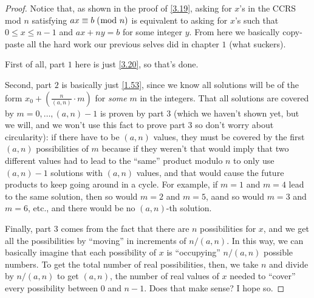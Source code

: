 \documentclass[../main.tex]{subfiles}
\begin{document}
\begin{proof}
  Notice that, as shown in the proof of \ref{3.19}, asking for $x$'s in the CCRS mod $n$ satisfying $ax \equiv b \; (\bmod \; n)$ is equivalent to asking for $x$'s such that $0 \leq x \leq n-1$ and $ax + ny = b$ for some integer $y$. From here we basically copy-paste all the hard work our previous selves did in chapter $1$ (what suckers).

  First of all, part $1$ here is just \ref{3.20}, so that's done.

  Second, part $2$ is basically just \ref{1.53}, since we know all solutions will be of the form $x_0 + \left( \frac{n}{(a,n)} \cdot m \right)$ for \emph{some} $m$ in the integers. That all solutions are covered by $m = 0, \ldots, (a,n) - 1$ is proven by part $3$ (which we haven't shown yet, but we will, and we won't use this fact to prove part $3$ so don't worry about circularity): if there have to be $(a,n)$ values, they must be covered by the first $(a,n)$ possibilities of $m$ because if they weren't that would imply that two different values had to lead to the ``same'' product modulo $n$ to only use $(a,n) - 1$ solutions with $(a, n)$ values, and that would cause the future products to keep going around in a cycle.
  For example, if $m = 1$ and $m = 4$ lead to the same solution, then so would $m = 2$ and $m = 5$, aand so would $m = 3$ and $m = 6$, etc., and there would be no $(a, n)$-th solution.

  Finally, part $3$ comes from the fact that there are $n$ possibilities for $x$, and we get all the possibilities by ``moving'' in increments of $n / (a,n)$. In this way, we can basically imagine that each possibility of $x$ is ``occupying'' $n / (a,n)$ possible numbers. To get the total number of real possibilities, then, we take $n$ and divide by $n / (a, n)$ to get $(a, n)$, the number of real values of $x$ needed to ``cover'' every possibility between $0$ and $n-1$. Does that make sense? I hope so.
\end{proof}
\end{document}
